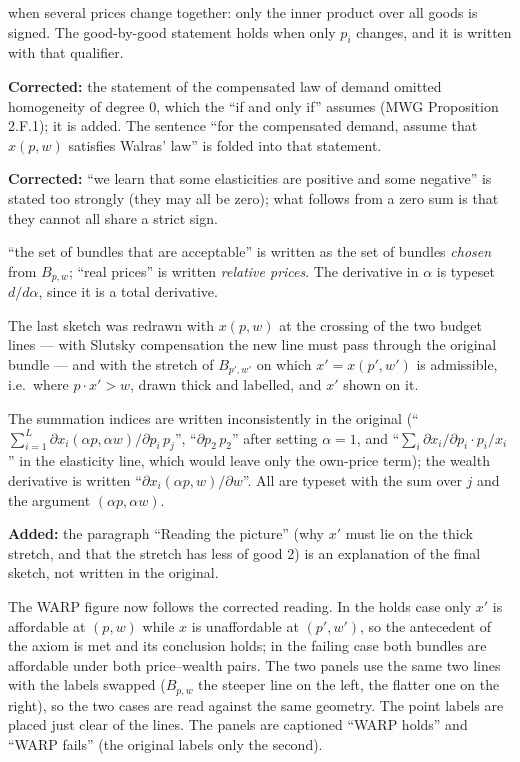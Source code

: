 \documentclass[11pt]{article}
\begin{document}
\begin{transcriptnotes}
        when several prices change together: only the inner product over all goods
        is signed. The good-by-good statement holds when only $p_i$ changes, and it
        is written with that qualifier.
  \item \textbf{Corrected:} the statement of the compensated law of demand omitted
        homogeneity of degree 0, which the ``if and only if'' assumes (MWG
        Proposition 2.F.1); it is added. The sentence ``for the
        compensated demand, assume that $x(p,w)$ satisfies Walras' law'' is
        folded into that statement.
  \item \textbf{Corrected:} ``we learn that some elasticities are positive and some
        negative'' is stated too strongly (they may all be zero); what follows from
        a zero sum is that they cannot all share a strict sign.
  \item ``the set of bundles that are acceptable'' is written as the set of bundles
        \emph{chosen} from $B_{p,w}$; ``real prices'' is written \emph{relative
        prices}. The derivative in $\alpha$ is typeset $d/d\alpha$, since it is a
        total derivative.
  \item The last sketch was redrawn with $x(p,w)$ at the crossing of the two budget
        lines --- with Slutsky compensation the new line must pass through the
        original bundle --- and with the stretch of $B_{p',w'}$ on which
        $x'=x(p',w')$ is admissible, i.e.\ where $p\cdot x'>w$, drawn thick and
        labelled, and $x'$ shown on it.
  \item The summation indices are written inconsistently in the original
        (``$\sum_{i=1}^{L}\partial x_i(\alpha p,\alpha w)/\partial p_i\,p_j$'',
        ``$\partial p_2\,p_2$'' after setting $\alpha=1$, and
        ``$\sum_i \partial x_i/\partial p_i\cdot p_i/x_i$'' in the elasticity line, which
        would leave only the own-price term); the wealth derivative is written
        ``$\partial x_i(\alpha p,w)/\partial w$''. All are typeset with the sum over
        $j$ and the argument $(\alpha p,\alpha w)$.
  \item \textbf{Added:} the paragraph ``Reading the picture'' (why $x'$ must lie on the
        thick stretch, and that the stretch has less of good 2) is an explanation of
        the final sketch, not written in the original.
  \item The WARP figure now follows the corrected reading. In the holds case only
        $x'$ is affordable at $(p,w)$ while $x$ is unaffordable at $(p',w')$, so the
        antecedent of the axiom is met and its conclusion holds; in the failing case
        both bundles are affordable under both price--wealth pairs. The two panels
        use the same two lines with the labels swapped ($B_{p,w}$ the steeper line on
        the left, the flatter one on the right), so the two cases are read against the
        same geometry. The point labels are placed just clear of the lines. The panels are captioned ``WARP holds'' and ``WARP fails'' (the original labels only the second).
\end{transcriptnotes}
\end{document}
